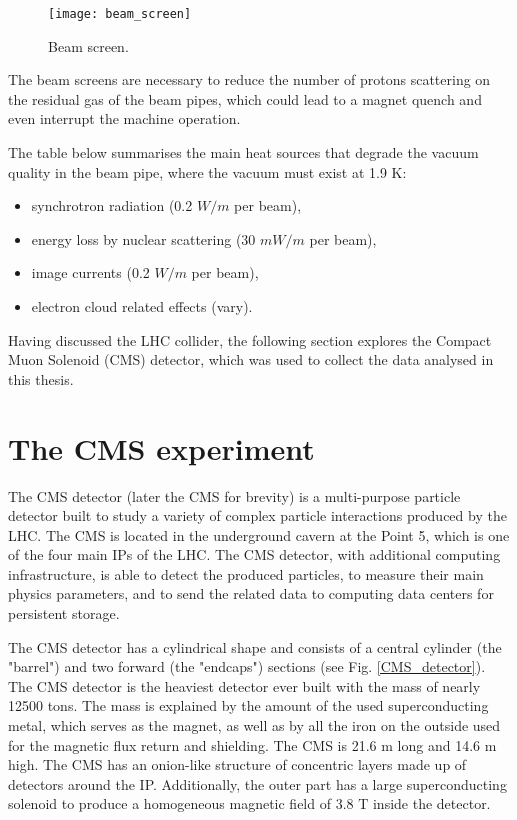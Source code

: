 \begin{normalsize}
\begin{figure}[H]
  \centering
  \texttt{[image: beam\_screen]}
  \caption{Beam screen.}\label{beam_screen}
\end{figure}



The beam screens are necessary to reduce the number of protons scattering on the residual gas of the beam pipes, which could lead to a magnet quench and even interrupt the machine operation. 

The table below summarises the main heat sources that degrade the vacuum quality in the beam pipe, where the vacuum must exist at 1.9 K:


\begin{itemize}
\item synchrotron radiation (0.2 $W/m$ per beam),
\item energy loss by nuclear scattering (30 $mW/m$ per beam),
\item image currents (0.2 $W/m$ per beam),
\item electron cloud related effects (vary).
\end{itemize}



Having discussed the LHC collider, the following section explores the Compact Muon Solenoid (CMS) detector, which was used to collect the data analysed in this thesis. 


\section{The CMS experiment}

The CMS detector (later the CMS for brevity) is a multi-purpose particle detector built to study a variety of complex particle interactions produced by the LHC. The CMS is located in the underground cavern at the Point 5, which is one of the four main IPs of the LHC. The CMS detector, with additional computing infrastructure, is able to detect the produced particles, to measure their main physics parameters, and to send the related data to computing data centers for persistent storage. 


The CMS detector has a cylindrical shape and consists of a central cylinder (the "barrel") and two forward (the "endcaps") sections (see Fig. \ref{CMS_detector}). 
The CMS detector is the heaviest detector ever built with the mass of nearly 12500 tons. The mass is explained by the amount of the used superconducting metal, which serves as the magnet, as well as by all the iron on the outside used for the magnetic flux return and shielding. The CMS is 21.6 m long and 14.6 m high. The CMS has an onion-like structure of concentric layers made up of detectors around the IP. Additionally, the outer part has a large superconducting solenoid to produce a homogeneous magnetic field of 3.8 T inside the detector.


\end{normalsize}
